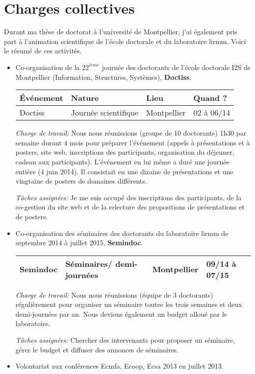 \section{Charges collectives}

Durant ma thèse de doctorat à l'université de Montpellier, j'ai également pris part à l'animation scientifique de l'école doctorale et du laboratoire lirmm. Voici le résumé de ces activités.

\begin{itemize}
\item Co-organisation de la $22^{i\grave{e}me}$ journée des doctorants de l'école doctorale I2S de Montpellier (Information, Structures, Systèmes), {\bf Doctiss}. 

\bigskip

\begin{tabular}{m{3cm}|m{4cm}|m{3cm}|m{3cm}}
\hline
Événement & Nature & Lieu & Quand ? \\
\hline 
Doctiss & Journée scientifique & Montpellier & 02 à 06/14 \\
\hline
\end{tabular}

\bigskip
\noindent
{\it Charge de travail:} Nous nous réunissions (groupe de $10$ doctorants) 1h30 par semaine durant $4$ mois pour préparer l’événement (appels à présentations et à posters, site web, inscriptions des participants, organisation du déjeuner, cadeau aux participants). L’événement en lui même a duré une journée entière (4 juin 2014). Il consistait en une dizaine de présentations et une vingtaine de posters de domaines différents. 

\medskip
\noindent
{\it Tâches assignées:} Je me suis occupé des inscriptions des participants, de la co-gestion du site web et de la relecture des propositions de présentations et de posters. 

\bigskip

\item Co-organisation des séminaires des doctorants du laboratoire lirmm de septembre 2014 à juillet 2015, {\bf Semindoc}.

\bigskip

\begin{tabular}{m{3cm}|m{4cm}|m{3cm}|m{3cm}} 
\hline
Semindoc & Séminaires/ demi-journées & Montpellier & 09/14 à 07/15 \\
\hline
\end{tabular}

\bigskip
\noindent
{\it Charge de travail:} Nous nous réunissions (équipe de $3$ doctorants) régulièrement pour organiser un séminaire toutes les trois semaines et deux demi-journées par an. Nous devions également un budget alloué par le laboratoire.

\medskip
\noindent
{\it Tâches assignées:} Chercher des intervenants pour proposer un séminaire, gérer le budget et diffuser des annonces de séminaires.

\item Volontariat aux conférences Ecmfa, Ecoop, Ecsa 2013 en juillet 2013. 

\end{itemize}  